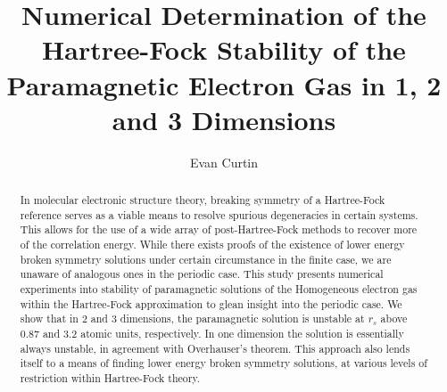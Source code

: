 \documentclass[preprint, journal=prl]{revtex4-1}
\begin{document}
\title{Numerical Determination of the Hartree-Fock Stability of the Paramagnetic Electron Gas in 1, 2 and 3 Dimensions}
\author{Evan Curtin}

\begin{abstract}
  In molecular electronic structure theory, breaking symmetry of a Hartree-Fock reference serves as a viable means to resolve spurious degeneracies in certain systems. This allows for the use of a wide array of post-Hartree-Fock methods to recover more of the correlation energy. While there exists proofs of the existence of lower energy broken symmetry solutions under certain circumstance in the finite case, we are unaware of analogous ones in the periodic case. This study presents numerical experiments into stability of paramagnetic solutions of the Homogeneous electron gas within the Hartree-Fock approximation to glean insight into the periodic case. We show that in 2 and 3 dimensions, the paramagnetic solution is unstable at $r_s$ above 0.87 and 3.2 atomic units, respectively. In one dimension the solution is essentially always unstable, in agreement with Overhauser's theorem. This approach also lends itself to a means of finding lower energy broken symmetry solutions, at various levels of restriction within Hartree-Fock theory.
\end{abstract}

\maketitle
\end{document}
